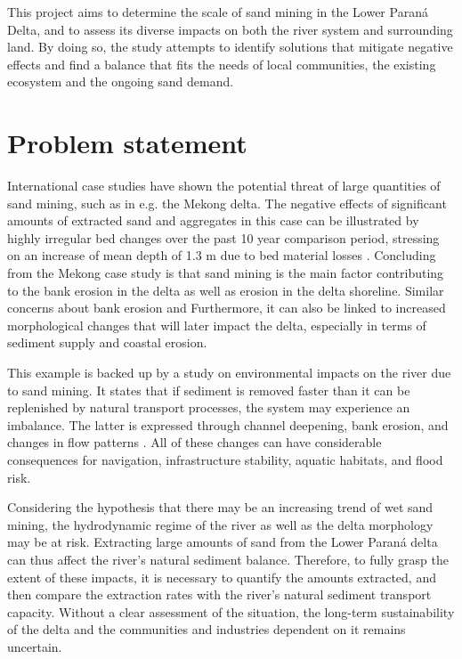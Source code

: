 This project aims to determine the scale of sand mining in the Lower Paraná Delta, and to assess its diverse impacts on both the river system and surrounding land. By doing so, the study attempts to identify solutions that mitigate negative effects and find a balance that fits the needs of local communities, the existing ecosystem and the ongoing sand demand.

\section{Problem statement}

International case studies have shown the potential threat of large quantities of sand mining, such as in e.g. the Mekong delta. The negative effects of significant amounts of extracted sand and aggregates in this case can be illustrated by highly irregular bed changes over the past 10 year comparison period, stressing on an increase of mean depth of 1.3 m due to bed material losses \autocite{brunierRecentMorphologicalChanges2014}. Concluding from the Mekong case study is that sand mining is the main factor contributing to the bank erosion in the delta as well as erosion in the delta shoreline. Similar concerns about bank erosion and Furthermore, it can also be linked to increased morphological changes that will later impact the delta, especially in terms of sediment supply and coastal erosion.

This example is backed up by a study on environmental impacts on the river due to sand mining. It states that if sediment is removed faster than it can be replenished by natural transport processes, the system may experience an imbalance. The latter is expressed through channel deepening, bank erosion, and changes in flow patterns \autocite{rentierEnvironmentalImpactsRiver2022}. All of these changes can have considerable consequences for navigation, infrastructure stability, aquatic habitats, and flood risk. 

Considering the hypothesis that there may be an increasing trend of wet sand mining, the hydrodynamic regime of the river as well as the delta morphology may be at risk. Extracting large amounts of sand from the Lower Paraná delta can thus affect the river's natural sediment balance. Therefore, to fully grasp the extent of these impacts, it is necessary to quantify the amounts extracted, and then compare the extraction rates with the river’s natural sediment transport capacity. Without a clear assessment of the situation, the long-term sustainability of the delta and the communities and industries dependent on it remains uncertain.

